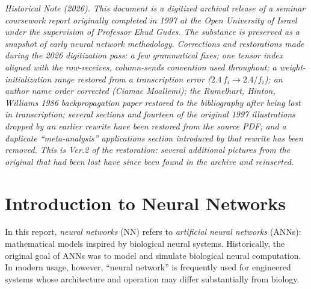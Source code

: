 \documentclass[12pt]{article}
\begin{document}
\begin{center}
\small\textit{Historical Note (2026). This document is a digitized archival release of a seminar coursework report originally completed in 1997 at the Open University of Israel under the supervision of Professor Ehud Gudes. The substance is preserved as a snapshot of early neural network methodology. Corrections and restorations made during the 2026 digitization pass: a few grammatical fixes; one tensor index aligned with the row-receives, column-sends convention used throughout; a weight-initialization range restored from a transcription error ($2.4\,f_i \rightarrow 2.4/f_i$); an author name order corrected (Ciamac Moallemi); the Rumelhart, Hinton, Williams 1986 backpropagation paper restored to the bibliography after being lost in transcription; several sections and fourteen of the original 1997 illustrations dropped by an earlier rewrite have been restored from the source PDF; and a duplicate ``meta-analysis'' applications section introduced by that rewrite has been removed. This is Ver.2 of the restoration: several additional pictures from the original that had been lost have since been found in the archive and reinserted.}
\end{center}

\newpage

\begin{abstract}
This coursework concerns backpropagation feed-forward neural networks (BPFFNNs), which historically comprised a large fraction of successful neural-network applications. The report reviews the main architectural ideas behind feed-forward networks, introduces the standard neuron model, and derives the generalized delta rule (backpropagation) as gradient descent in weight space, including a consistent tensor (matrix) form of the update. Two practical applications are discussed: classifying cells for cancer diagnosis and handwritten digit recognition. Finally, the report argues that incorporating problem-specific heuristics into the network topology and preprocessing is often necessary to obtain a network that is trainable, convergent, and able to generalize without severe underfitting or overfitting.
\end{abstract}

\tableofcontents
\newpage

\section{Introduction to Neural Networks}
In this report, \emph{neural networks} (NN) refers to \emph{artificial neural networks} (ANNs): mathematical models inspired by biological neural systems. Historically, the original goal of ANNs was to model and simulate biological neural computation. In modern usage, however, ``neural network'' is frequently used for engineered systems whose architecture and operation may differ substantially from biology.
\end{document}
